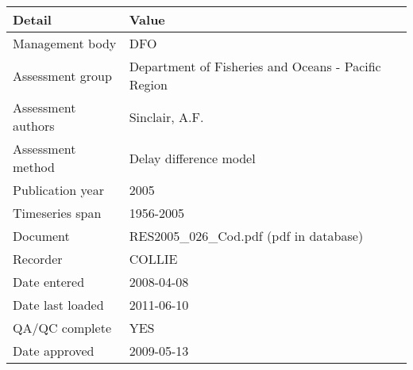 \begin{table}[htb]
\centering
\begin{tabular}{lp{7cm}}
\toprule
Detail & Value \\
\midrule
Management body    & DFO                                                 \\
Assessment group   & Department of Fisheries and Oceans - Pacific Region \\
Assessment authors & Sinclair, A.F.                                      \\
Assessment method  & Delay difference model                              \\
Publication year   & 2005                                                \\
Timeseries span    & 1956-2005                                           \\
Document           & RES2005\_026\_Cod.pdf (pdf in database)             \\
Recorder           & COLLIE                                              \\
Date entered       & 2008-04-08                                          \\
Date last loaded   & 2011-06-10                                          \\
QA/QC complete     & YES                                                 \\
Date approved      & 2009-05-13                                          \\
\bottomrule
\end{tabular}
\label{tab:assessdet}
\end{table}
